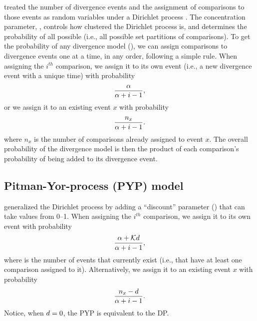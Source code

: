 \documentclass[letterpaper,12pt]{article}
\begin{document}
\begin{linenomath}
\citet{Oaks2018ecoevolity} treated the number of divergence events and the
assignment of comparisons to those events as random variables under a Dirichlet
process \citep{Ferguson1973, Antoniak1974}.
The concentration parameter, \concentration, controls how clustered the
Dirichlet process is, and determines the probability of all possible \etimesets
(i.e., all possible set partitions of \ncomparisons comparisons).
To get the probability of any divergence model (\etimesets), we can assign
comparisons to divergence events one at a time, in any order, following a
simple rule.
When assigning the $i^{th}$ comparison, we assign it to its own event
(i.e., a new divergence event with a unique time) with probability
\begin{equation}
    \frac{\alpha}{\alpha + i - 1},
    \label{eq:dpnewcat}
\end{equation}
or we assign it to an existing event $x$ with probability
\begin{equation}
    \frac{n_x}{\alpha + i - 1}.
    \label{eq:dpexistingcat}
\end{equation}
where $n_x$ is the number of comparisons already assigned to event $x$.
The overall probability of the divergence model is then the product of each
comparison's probability of being added to its divergence event.
\end{linenomath}

\subsection{Pitman-Yor-process (PYP) model}

\begin{linenomath}
\citet{PitmanYor1997} generalized the Dirichlet process by adding a
``discount'' parameter (\discount) that can take values from 0--1.
When assigning the $i^{th}$ comparison, we assign it to its own event
with probability
\begin{equation}
    \frac{\alpha + \mathcal{K} d}{\alpha + i - 1},
    \label{eq:pypnewcat}
\end{equation}
where \nexistingcats is the number of events that currently exist (i.e., that have at
least one comparison assigned to it).
Alternatively, we assign it to an existing event $x$ with probability
\begin{equation}
    \frac{n_x - d}{\alpha + i -1}.
    \label{eq:pypexistingcat}
\end{equation}
Notice, when $d = 0$, the PYP is equivalent to the DP.
\end{linenomath}
\end{document}
